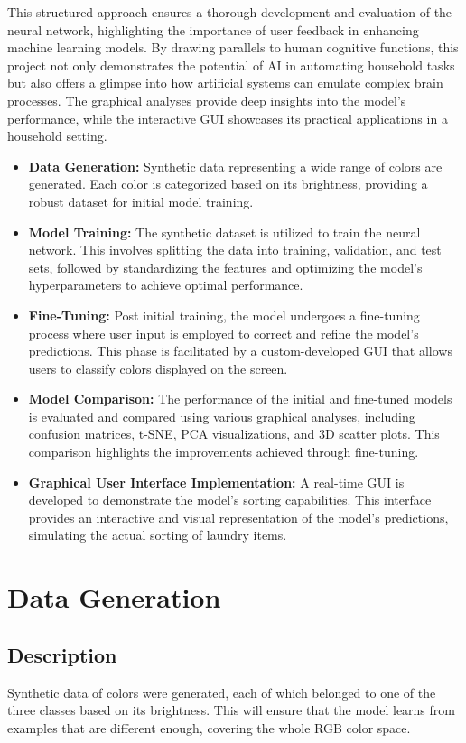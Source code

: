 \documentclass{article}
\begin{document}
This structured approach ensures a thorough development and evaluation of the neural network, highlighting the importance of user feedback in enhancing machine learning models. By drawing parallels to human cognitive functions, this project not only demonstrates the potential of AI in automating household tasks but also offers a glimpse into how artificial systems can emulate complex brain processes. The graphical analyses provide deep insights into the model's performance, while the interactive GUI showcases its practical applications in a household setting.
\begin{itemize}
    \item \textbf{Data Generation:} Synthetic data representing a wide range of colors are generated. Each color is categorized based on its brightness, providing a robust dataset for initial model training.
    \item \textbf{Model Training:} The synthetic dataset is utilized to train the neural network. This involves splitting the data into training, validation, and test sets, followed by standardizing the features and optimizing the model's hyperparameters to achieve optimal performance.
    \item \textbf{Fine-Tuning:} Post initial training, the model undergoes a fine-tuning process where user input is employed to correct and refine the model's predictions. This phase is facilitated by a custom-developed GUI that allows users to classify colors displayed on the screen.
    \item \textbf{Model Comparison:} The performance of the initial and fine-tuned models is evaluated and compared using various graphical analyses, including confusion matrices, t-SNE, PCA visualizations, and 3D scatter plots. This comparison highlights the improvements achieved through fine-tuning.
    \item \textbf{Graphical User Interface Implementation:} A real-time GUI is developed to demonstrate the model's sorting capabilities. This interface provides an interactive and visual representation of the model's predictions, simulating the actual sorting of laundry items.
\end{itemize}

\section{Data Generation}
\subsection{Description}
Synthetic data of colors were generated, each of which belonged to one of the three classes based on its brightness. This will ensure that the model learns from examples that are different enough, covering the whole RGB color space.
\end{document}
